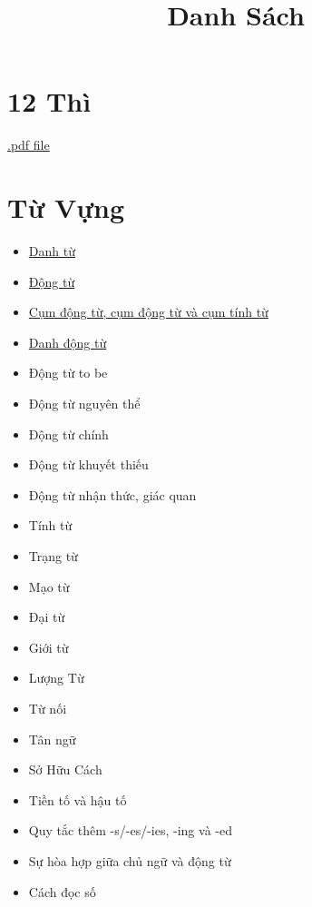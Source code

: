 \title{\Huge \textbf{Danh Sách}}
\maketitle
\tableofcontents

\chapter{12 Thì}
\href{https://github.com/theslime016/english-project/blob/main/english-project-release-files/12Tenses.pdf}
{.pdf file}
\chapter{Từ Vựng}
\begin{multicols*}{2}
    \begin{itemize}
        \item \href{https://github.com/theslime016/english-project/blob/main/english-project-release-files/Noun.pdf}{Danh từ}
        \item \href{https://github.com/theslime016/english-project/blob/main/english-project-release-files/Verb.pdf}{Động từ}
        \item \href{https://github.com/theslime016/english-project/blob/main/english-project-release-files/Phrasal.pdf}{Cụm động từ, cụm động từ và cụm tính từ}
        \item \href{https://github.com/theslime016/english-project/blob/main/english-project-release-files/Gerunds.pdf}{Danh động từ}
        \item Động từ to be
        \item Động từ nguyên thể
        \item Động từ chính
        \item Động từ khuyết thiếu
        \item Động từ nhận thức, giác quan
        \item Tính từ
        \item Trạng từ
        \item Mạo từ
        \item Đại từ
        \item Giới từ
        \item Lượng Từ
        \item Từ nối
        \item Tân ngữ
        \item Sở Hữu Cách
        \item Tiền tố và hậu tố
        \item Quy tắc thêm -s/-es/-ies, -ing và -ed
        \item Sự hòa hợp giữa chủ ngữ và động từ
        \item Cách đọc số
    \end{itemize}
\end{multicols*}

